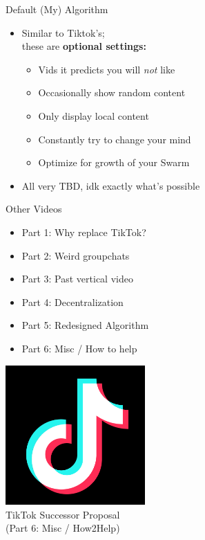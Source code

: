 \documentclass[aspectratio=35]{beamer} %
\begin{document}
\begin{frame}{Default (My) Algorithm}
\vspace{-1.4in}
\begin{itemize}
    \item Similar to Tiktok's;\\these are \textbf{optional settings:}
    \begin{itemize}
        \item Vids it predicts you will \textit{not} like
        \item Occasionally show random content
        \item Only display local content
        \item Constantly try to change your mind
        \item Optimize for growth of your Swarm
    \end{itemize}
    \item All very TBD, idk exactly what's possible
\end{itemize}
\end{frame}

\begin{frame}{Other Videos}
\centering
\tiny
\vspace{-1.5in}
\begin{itemize}
    \item Part 1: Why replace TikTok?
    \item Part 2: Weird groupchats 
    \item Part 3: Past vertical video
    \item Part 4: Decentralization
    \item Part 5: Redesigned Algorithm
    \item Part 6: Misc / How to help
\end{itemize}
\end{frame}

\begin{frame}
\centering
\vspace{-1in}
\includegraphics[width=0.4\textwidth]{imgs/app_icons/tiktok-icon2.png}\\
TikTok Successor Proposal \\
(Part 6: Misc / How2Help)
\end{frame}
\end{document}
